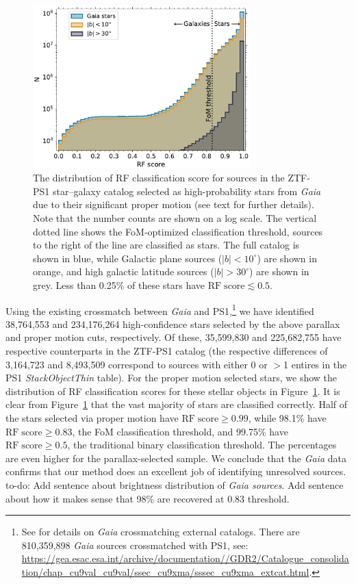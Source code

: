 \documentclass[twocolumn]{aastex62}
\newcommand{\todo}[1]{{\color{magenta} to-do: {#1}}}
\begin{document}
\begin{CJK*}{UTF8}{gbsn}
\begin{figure}[htb]
 \centering
  \includegraphics[width=3.3in]{./Figures/Gaia_PS1_pm_hist.pdf}
  \caption{ 
  The distribution of RF classification score for sources in the ZTF-PS1
  star--galaxy catalog selected as high-probability stars from \textit{Gaia}
  due to their significant proper motion (see text for further details).
  Note that the number counts are shown on a log scale. The vertical dotted
  line shows the FoM-optimized classification threshold, sources to the
  right of the line are classified as stars. The full catalog is shown in
  blue, while Galactic plane sources ($|b| < 10^{\circ}$) are shown in
  orange, and high galactic latitude sources ($|b| > 30^{\circ}$) are shown
  in grey. Less than 0.25\% of these stars have $\mathrm{RF\;score} \lesssim
  0.5$.
  }
  \label{fig:gaia}
\end{figure}

Using the existing crossmatch between \textit{Gaia} and PS1,\footnote{See
\citet{Marrese17} for details on \textit{Gaia} crossmatching external
catalogs. There are 810,359,898 \textit{Gaia} sources crossmatched with PS1,
see:
\url{https://gea.esac.esa.int/archive/documentation//GDR2/Catalogue_consolida
 tion/chap_cu9val_cu9val/ssec_cu9xma/sssec_cu9xma_extcat.html}.} we have
identified 38,764,553 and 234,176,264 high-confidence stars selected by the
above parallax and proper motion cuts, respectively. Of these, 35,599,830
and 225,682,755 have respective counterparts in the ZTF-PS1 catalog (the
respective differences of 3,164,723 and 8,493,509 correspond to sources with
either 0 or $>$1 entires in the PS1 \textit{StackObjectThin} table). For the
proper motion selected stars, we show the distribution of RF classification
scores for these stellar objects in Figure~\ref{fig:gaia}. It is clear from
Figure~\ref{fig:gaia} that the vast majority of stars are classified
correctly. Half of the stars selected via proper motion have
$\mathrm{RF\;score}\ge 0.99$, while 98.1\% have $\mathrm{RF\;score}\ge
0.83$, the FoM classification threshold, and 99.75\% have
$\mathrm{RF\;score}\ge 0.5$, the traditional binary classification
threshold. The percentages are even higher for the parallax-selected sample.
We conclude that the \textit{Gaia} data confirms that our method does an
excellent job of identifying unresolved sources. \todo{Add sentence about brightness distribution of \textit{Gaia sources}. Add sentence about how it makes sense that 98\% are recovered at 0.83 threshold.}


\end{CJK*}
\end{document}
